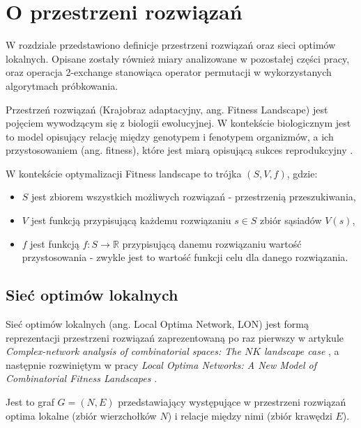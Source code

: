 \chapter{O przestrzeni rozwiązań}
W rozdziale przedstawiono definicje przestrzeni rozwiązań oraz sieci optimów lokalnych.
Opisane zostały również miary analizowane w pozostałej części pracy, oraz operacja 2-exchange stanowiąca operator permutacji w wykorzystanych algorytmach próbkowania.

Przestrzeń rozwiązań (Krajobraz adaptacyjny, ang. Fitness Landscape) jest pojęciem wywodzącym się z biologii ewolucyjnej.
W kontekście biologicznym jest to model opisujący relację między genotypem i fenotypem organizmów, a ich przystosowaniem (ang. fitness),
które jest miarą opisującą sukces reprodukcyjny \cite{FRAGATA201969}.

W kontekście optymalizacji Fitness landscape to trójka $(S, V, f)$, gdzie:
\begin{itemize}
      \item $S$ jest zbiorem wszystkich możliwych rozwiązań - przestrzenią przeszukiwania,
      \item $V$ jest funkcją przypisującą każdemu rozwiązaniu $s\in{S}$ zbiór sąsiadów $V(s)$,
      \item $f$ jest funkcją $f:S \rightarrow \mathbb{R}$ przypisującą danemu rozwiązaniu wartość przystosowania
            - zwykle jest to wartość funkcji celu dla danego rozwiązania.
\end{itemize}

\section{Sieć optimów lokalnych}
Sieć optimów lokalnych (ang. Local Optima Network, LON) jest formą reprezentacji przestrzeni rozwiązań zaprezentowaną po raz pierwszy w artykule \textit{Complex-network analysis of combinatorial spaces: The $NK$ landscape case} \cite{PhysRevE.78.066114},
a następnie rozwiniętym w pracy \textit{Local Optima Networks: A New Model of Combinatorial Fitness Landscapes} \cite{DBLP:journals/corr/OchoaVDT14}.

Jest to graf $G = (N, E)$ przedstawiający występujące w przestrzeni rozwiązań optima lokalne (zbiór wierzchołków $N$)
i relacje między nimi (zbiór krawędzi $E$).


